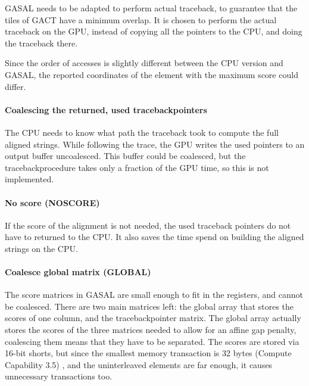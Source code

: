 \documentclass[../main/thesis.tex]{subfiles}
\begin{document}
GASAL needs to be adapted to perform actual traceback, to guarantee that the tiles of GACT have a minimum overlap.
It is chosen to perform the actual traceback on the GPU, instead of copying all the pointers to the CPU, and doing the traceback there.

Since the order of accesses is slightly different between the CPU version and GASAL, the reported coordinates of the element with the maximum score could differ.



\paragraph{Coalescing the returned, used tracebackpointers}
The CPU needs to know what path the traceback took to compute the full aligned strings.
While following the trace, the GPU writes the used pointers to an output buffer uncoalesced.
This buffer could be coalesced, but the tracebackprocedure takes only a fraction of the GPU time, so this is not implemented.

\paragraph{No score (NOSCORE)}
If the score of the alignment is not needed, the used traceback pointers do not have to returned to the CPU.
It also saves the time spend on building the aligned strings on the CPU.


\paragraph{Coalesce global matrix (GLOBAL)}
The score matrices in GASAL are small enough to fit in the registers, and cannot be coalesced.
There are two main matrices left: the global array that stores the scores of one column, and the tracebackpointer matrix.
The global array actually stores the scores of the three matrices needed to allow for an affine gap penalty, coalescing them means that they have to be separated.
The scores are stored via 16-bit shorts, but since the smallest memory transaction is 32 bytes (Compute Capability 3.5) \cite{cuda}, and the uninterleaved elements are far enough, it causes unnecessary transactions too.
\end{document}

